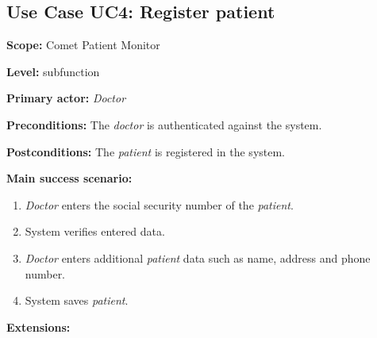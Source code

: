 \documentclass[fontsize=12pt,
               paper=a4,
               twoside=false,
               parskip=half,
               ]{scrartcl}
\begin{document}

\subsection{Use Case UC4: Register patient}

\textbf{\textsf{Scope:}} Comet Patient Monitor

\textbf{\textsf{Level:}} subfunction

\textbf{\textsf{Primary actor:}} \emph{Doctor}

\textbf{\textsf{Preconditions:}} The \emph{doctor} is authenticated against the system.

\textbf{\textsf{Postconditions:}} The \emph{patient} is registered in the system.

\textbf{\textsf{Main success scenario:}}

\begin{enumerate}[leftmargin=3em]
	\item \emph{Doctor} enters the social security number of the \emph{patient}.
	\item System verifies entered data.
	\item \emph{Doctor} enters additional \emph{patient} data such as name, address and phone number.
	\item System saves \emph{patient}.
\end{enumerate}

\textbf{\textsf{Extensions:}}
\end{document}
